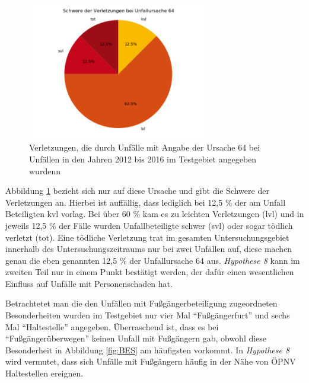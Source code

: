 \begin{savenotes}
	\begin{figure}[H]
		\centering
		\includegraphics[width=8cm,height=6cm]{figures/Urs64}
		\caption[Verletzungen, die durch Unfälle mit Angabe der Ursache 64 bei Unfällen in den Jahren 2012 bis 2016 im Testgebiet angegeben wurden]{Verletzungen, die durch Unfälle mit Angabe der Ursache 64 bei Unfällen in den Jahren 2012 bis 2016 im Testgebiet angegeben wurdenn}\label{fig:Verletzungen_Urs64}
	\end{figure}
\end{savenotes}

Abbildung \ref{fig:Verletzungen_Urs64} bezieht sich nur auf diese Ursache und gibt die Schwere der Verletzungen an. Hierbei ist auffällig, dass lediglich bei 12,5 \% der am Unfall Beteiligten \ac{kvl} vorlag. Bei über 60 \% kam es zu leichten Verletzungen (lvl) und in jeweils 12,5 \% der Fälle wurden Unfallbeteiligte schwer (svl) oder sogar tödlich verletzt (tot). Eine tödliche Verletzung trat im gesamten Untersuchungsgebiet innerhalb des Untersuchungszeitraums nur bei zwei Unfällen auf, diese machen genau die eben genannten 12,5 \% der Unfallursache 64 aus. \textit{Hypothese 8} kann im zweiten Teil nur in einem Punkt bestätigt werden, der dafür einen wesentlichen Einfluss auf Unfälle mit Personenschaden hat.

Betrachtetet man die den Unfällen mit Fußgängerbeteiligung zugeordneten Besonderheiten wurden im Testgebiet nur vier Mal \enquote{Fußgängerfurt} und sechs Mal \enquote{Haltestelle} angegeben. Überraschend ist, dass es bei \enquote{Fußgängerüberwegen} keinen Unfall mit Fußgängern gab, obwohl diese Besonderheit in Abbildung \ref{fig:BES} am häufigsten vorkommt. In \textit{Hypothese 8} wird vermutet, dass sich Unfälle mit Fußgängern häufig in der Nähe von ÖPNV Haltestellen ereignen.

